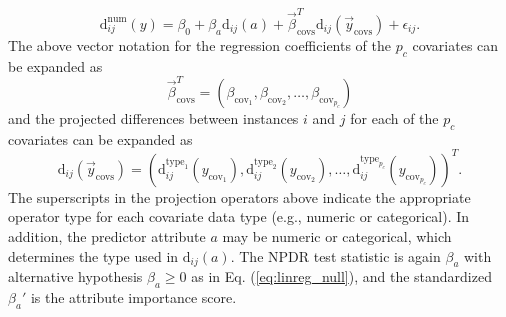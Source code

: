\documentclass{bioinfo}
\begin{document}
\begin{equation}\label{eq:lin_reg_cov}
    \text{d}^{\text{num}}_{ij}(y) = \beta_{0} + \beta_{a} \text{d}_{ij}(a) + \vec{\beta}^{T}_{\text{covs}}\text{d}_{ij}(\vec{y}_{\text{covs}}) + \epsilon_{ij}.
\end{equation}
The above vector notation for the regression coefficients of the $p_c$ covariates can be expanded as  
\begin{equation}
\vec{\beta}^{T}_{\text{covs}} = \left( \beta_{\text{cov}_1}, \beta_{\text{cov}_2}, \ldots,  \beta_{\text{cov}_{p_c}} \right)
\end{equation}
and the projected differences between instances $i$ and $j$ for each of the $p_c$ covariates can be expanded as
\begin{equation}
\text{d}_{ij}(\vec{y}_\text{covs})= \left( \text{d}^{\text{type}_1}_{ij}({y}_{\text{cov}_1}), \text{d}^{\text{type}_2}_{ij}({y}_{\text{cov}_2}), \ldots, \text{d}^{\text{type}_{p_c}}_{ij}({y}_{\text{cov}_{p_c}}) \right)^{T}.
\end{equation}
The superscripts in the projection operators above indicate the appropriate operator type for each covariate data type (e.g., numeric or categorical).
In addition, the predictor attribute $a$ may be numeric or categorical, which determines the type used in $\text{d}_{ij}(a)$.
The NPDR test statistic is again $\beta_a$ with alternative hypothesis $\beta_a \ge 0$ as in Eq. (\ref{eq:linreg_null}), and the standardized $\beta_a'$ is the attribute importance score. 
\end{document}
